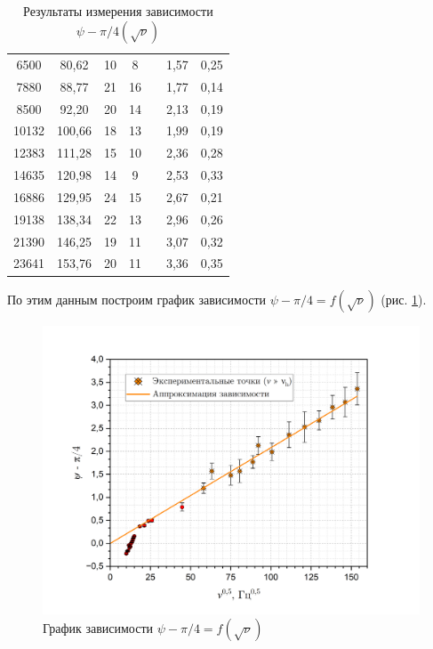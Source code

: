 \documentclass[a4paper, 12pt]{article}
\begin{document}
\begin{table}[H]
\begin{tabular}{|c|c|c|c|c|c|c|}
        6500 & 80,62 & 10 & 8 &  & 1,57 & 0,25 \\ \cline{1-4} \cline{6-7} 
        7880 & 88,77 & 21 & 16 &  & 1,77 & 0,14 \\ \cline{1-4} \cline{6-7} 
        8500 & 92,20 & 20 & 14 &  & 2,13 & 0,19 \\ \cline{1-4} \cline{6-7} 
        10132 & 100,66 & 18 & 13 &  & 1,99 & 0,19 \\ \cline{1-4} \cline{6-7} 
        12383 & 111,28 & 15 & 10 &  & 2,36 & 0,28 \\ \cline{1-4} \cline{6-7} 
        14635 & 120,98 & 14 & 9 &  & 2,53 & 0,33 \\ \cline{1-4} \cline{6-7} 
        16886 & 129,95 & 24 & 15 &  & 2,67 & 0,21 \\ \cline{1-4} \cline{6-7} 
        19138 & 138,34 & 22 & 13 &  & 2,96 & 0,26 \\ \cline{1-4} \cline{6-7} 
        21390 & 146,25 & 19 & 11 &  & 3,07 & 0,32 \\ \cline{1-4} \cline{6-7} 
        23641 & 153,76 & 20 & 11 &  & 3,36 & 0,35 \\ \hline
        \end{tabular}
        \caption{Результаты измерения зависимости $\psi - \pi/4(\sqrt{\nu})$}
        \label{table:phase_gg}
    \end{table}

    По этим данным построим график зависимости $\psi - \pi/4 = f(\sqrt{\nu})$ (рис. \ref{graph:psi}).

    \begin{figure}[H]
        \centering
        \includegraphics[width = 14 cm]{images/graph_psi.png}
        \caption{График зависимости $\psi - \pi/4 = f(\sqrt{\nu})$}
        \label{graph:psi}
    \end{figure}
\end{document}
